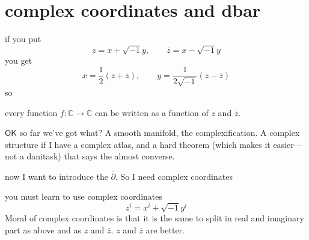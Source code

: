 \section{complex coordinates and dbar}

if you put
\[z=x+\sqrt{-1}y,\qquad \overline{z}=x-\sqrt{-1}y\]
you get
\[x=\frac{1}{2}(z+\overline{z}),\qquad y=\frac{1}{2\sqrt{-1}}(z-\overline{z})\]
so
\begin{tcolorbox}[colback=white,colframe=black,boxrule=0.5pt,sharp corners]
every function \(f:\mathbb{C}\to \mathbb{C}\) can be written as a function of \(z\) and \(\overline{z}\).
\end{tcolorbox}
\(\mathsf{OK}\) so far we've got what? A smooth manifold, the complexification. A complex structure if I have a complex atlas, and a hard theorem (which makes it easier---not a danitask) that says the almost converse.

now I want to introduce the \(\overline{\partial}\). So I need complex coordinates

you must learn to use complex coordinates
\[z^i=x^i+\sqrt{-1}y^i \]
Moral of complex coordinates is that it is the same to split in real and imaginary part as above and as \(z\) and \(\bar{z} \). \(z\) and \(\overline{z}\) are better.

